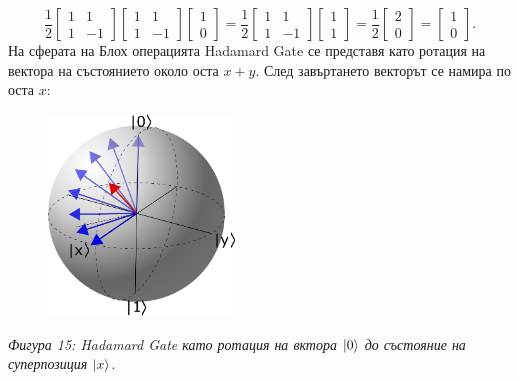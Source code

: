     \begin{equation}
        \frac{1}{2} \begin{bmatrix}
            1 & 1\\
            1 & -1
        \end{bmatrix} \begin{bmatrix}
            1 & 1\\
            1 & -1
        \end{bmatrix} \begin{bmatrix}
            1\\
            0
        \end{bmatrix} = \frac{1}{2} \begin{bmatrix}
            1 & 1\\
            1 & -1
        \end{bmatrix} \begin{bmatrix}
            1\\
            1
        \end{bmatrix} = \frac{1}{2} \begin{bmatrix}
            2\\
            0
        \end{bmatrix} = \begin{bmatrix}
            1\\
            0
        \end{bmatrix}.
    \end{equation}
    На сферата на Блох операцията Hadamard Gate се представя като ротация на вектора на състоянието около оста $x + y$.
    След завъртането векторът се намира по оста $x$: 

    \begin{figure}[H]
        \centering
        \includegraphics[width=140pt]{17.png}
    \end{figure}
    \begin{center}
        \small \textit{Фигура 15: Hadamard Gate като ротация на вктора $\ket{0}$ до състояние на суперпозиция $\ket{x}$.}
    \end{center}


